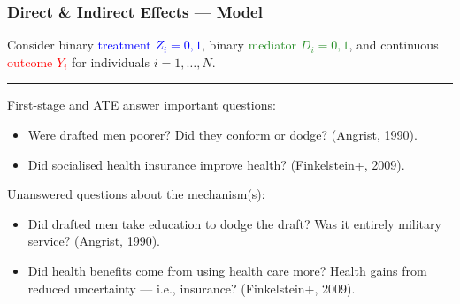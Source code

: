 \documentclass[dvipsnames]{beamer} %
\begin{document}
\begin{frame}[noframenumbering]
    \frametitle{Direct \& Indirect Effects --- Model}
    Consider binary \textcolor{blue}{treatment $Z_i = 0, 1$},
    binary \textcolor{ForestGreen}{mediator $D_i = 0, 1$},
    and continuous \textcolor{red}{outcome $Y_i$} for individuals $i = 1, \hdots, N$.
    \vskip-0.5cm
    \begin{figure}
        \centering
        \singlespacing
    \end{figure}
    \vskip-0.5cm
    \par\noindent\rule{\textwidth}{0.4pt}
    \pause
    First-stage and ATE answer important questions:
    \begin{itemize}
        \item Were drafted men poorer?
        Did they conform or dodge?
        (Angrist, 1990).
        \item Did socialised health insurance improve health? (Finkelstein+, 2009).
    \end{itemize}
    \vskip0.25cm
    \pause
    Unanswered questions about the mechanism(s):
    \begin{itemize}
        \item Did drafted men take education to dodge the draft?
        Was it entirely military service?
        (Angrist, 1990).
        \item Did health benefits come from using health care more?
        Health gains from reduced uncertainty --- i.e., insurance?
        (Finkelstein+, 2009).
    \end{itemize}
\end{frame}%
\end{document}
